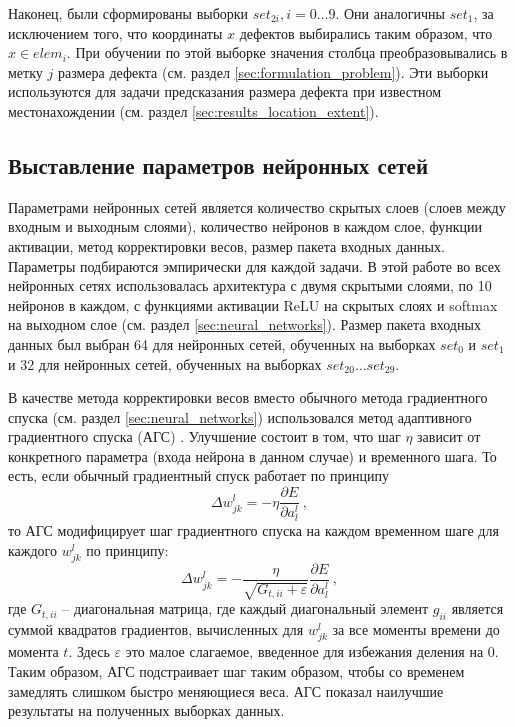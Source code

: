 \documentclass[a4paper,12pt]{article}
\theoremstyle{remark}
\begin{document}
 	Наконец, были сформированы выборки $set_{2i}, i = 0 \dots 9$. Они аналогичны $set_1$, за исключением того, что координаты $x$ дефектов выбирались таким образом, что $x \in elem_i$. При обучении по этой выборке значения столбца преобразовывались в метку $j$ размера дефекта (см. раздел \ref{sec:formulation_problem}). Эти выборки используются для задачи предсказания размера дефекта при известном местонахождении (см. раздел \ref{sec:results_location_extent}).
 	
 	\subsection{Выставление параметров нейронных сетей}
 	Параметрами нейронных сетей является количество скрытых слоев (слоев между входным и выходным слоями), количество нейронов в каждом слое, функции активации, метод корректировки весов, размер пакета входных данных. Параметры подбираются эмпирически для каждой задачи. В этой работе во всех нейронных сетях использовалась архитектура с двумя скрытыми слоями, по 10 нейронов в каждом, с функциями активации ReLU на скрытых слоях и softmax на выходном слое (см. раздел \ref{sec:neural_networks}). Размер пакета входных данных был выбран 64 для нейронных сетей, обученных на выборках $set_0$ и $set_1$ и 32 для нейронных сетей, обученных на выборках $set_{20} \dots set_{29}$.
 	
 	В качестве метода корректировки весов вместо обычного метода градиентного спуска (см. раздел \ref{sec:neural_networks}) использовался метод адаптивного градиентного спуска (АГС) \cite{adagrad}. Улучшение состоит в том, что шаг $\eta$ зависит от конкретного параметра (входа нейрона в данном случае) и временного шага. То есть, если обычный градиентный спуск работает по принципу
 	\begin{equation}
 		\Delta w_{jk}^l = - \eta \frac{\partial E}{\partial a_l^l}\ ,
 	\end{equation}
 	то АГС модифицирует шаг градиентного спуска на каждом временном шаге для каждого $w_{jk}^l$ по принципу:
 	\begin{equation}\label{eq:adagrad}
 		\Delta w_{jk}^l = - \frac{\eta}{\sqrt{G_{t,ii} + \varepsilon}} \frac{\partial E}{\partial a_l^l}\ ,
 	\end{equation}
 	где $G_{t,ii}$ -- диагональная матрица, где каждый диагональный элемент $g_{ii}$ является суммой квадратов градиентов, вычисленных для $w_{jk}^l$ за все моменты времени до момента $t$. Здесь $\varepsilon$ это малое слагаемое, введенное для избежания деления на 0. Таким образом, АГС подстраивает шаг таким образом, чтобы со временем замедлять слишком быстро меняющиеся веса. АГС показал наилучшие результаты на полученных выборках данных.
 	
\end{document}

